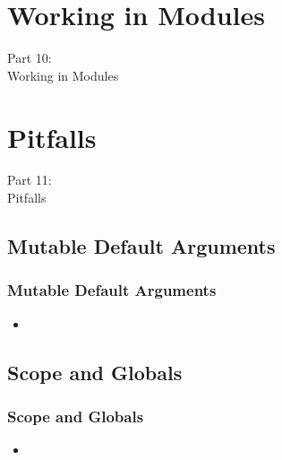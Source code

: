 
\section{Working in Modules}
\begin{frame}
    \vspace{25mm}
    \begin{center}
        \Huge{Part 10:\\Working in Modules}
    \end{center}
\end{frame}


\section{Pitfalls}
\begin{frame}
    \vspace{25mm}
    \begin{center}
        \Huge{Part 11:\\Pitfalls}
    \end{center}
\end{frame}

\subsection{Mutable Default Arguments}
\begin{frame}
    \frametitle{Mutable Default Arguments}
    \vspace{5mm}
    
    \begin{itemize}
      \item 
    \end{itemize}
\end{frame}

\subsection{Scope and Globals}
\begin{frame}
    \frametitle{Scope and Globals}
    \vspace{5mm}
    
    \begin{itemize}
      \item 
    \end{itemize}
\end{frame}

